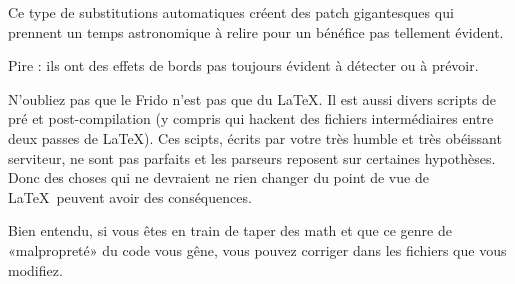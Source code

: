Ce type de substitutions automatiques créent des patch gigantesques qui prennent un temps astronomique à relire pour un bénéfice pas tellement évident.

Pire : ils ont des effets de bords pas toujours évident à détecter ou à prévoir.

N'oubliez pas que le Frido n'est pas que du \LaTeX. Il est aussi divers scripts de pré et post-compilation (y compris qui hackent des fichiers intermédiaires entre deux passes de \LaTeX). Ces scipts, écrits par votre très humble et très obéissant serviteur, ne sont pas parfaits et les parseurs reposent sur certaines hypothèses. Donc des choses qui ne devraient ne rien changer du point de vue de \LaTeX\ peuvent avoir des conséquences.

Bien entendu, si vous êtes en train de taper des math et que ce genre de «malpropreté» du code vous gêne, vous pouvez corriger dans les fichiers que vous modifiez.
